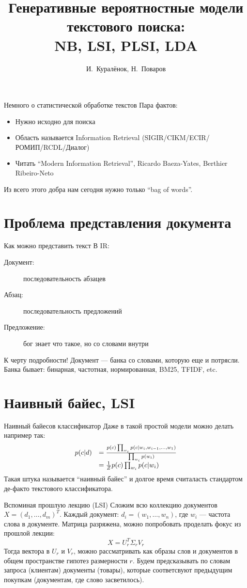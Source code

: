 \documentclass[14pt, fleqn, xcolor={dvipsnames, table}]{beamer}
\title{Генеративные вероятностные модели текстового поиска:\\\small{NB, LSI, PLSI, LDA}}
\author[]{\small{%
И.~Куралёнок,
Н.~Поваров}}
\date{}
\begin{document}
\begin{frame}{Немного о статистической обработке текстов}
Пара фактов:
\begin{itemize}
  \item Нужно исходно для поиска
  \item Область называется Information Retrieval (SIGIR/CIKM/ECIR/РОМИП/RCDL/Диалог)
  \item Читать ``Modern Information Retrieval'', Ricardo Baeza-Yates, Berthier Ribeiro-Neto
\end{itemize}
Из всего этого добра нам сегодня нужно только ``bag of words''.
\end{frame}

\section{Проблема представления документа}
\begin{frame}{Как можно представить текст}
В IR:
\begin{description}
  \item[Документ:] последовательность абзацев
  \item[Абзац:] последовательность предложений
  \item[Предложение:] бог знает что такое, но со словами внутри
\end{description}
К черту подробности! Документ --- банка со словами, которую еще и потрясли.\\ Банка бывает: бинарная, частотная, нормированная, BM25, TFIDF, etc.
\end{frame}

\section{Наивный байес, LSI}

\begin{frame}{Наивный байесов классификатор}
Даже в такой простой модели можно делать например так:
$$\begin{array}{ll}
p(c|d) &= {p(c)\prod_{w_i} p(c|w_i, w_{i-1}, \ldots, w_1) \over \prod_{w_i} p(w_i)} \\
& = \frac{1}{Z} p(c) \prod_{w_i} p(c|w_i)
\end{array}$$
Такая штука называется ``наивный байес'' и долгое время считаласть стандартом де-факто текстового классификатора.
\end{frame}

\begin{frame}{Вспоминая прошлую лекцию (LSI)}
\small
Сложим всю коллекцию документов $X = (d_1,\ldots,d_m)^T$. Каждый документ: $d_i = (w_1, \dots, w_n)$, где $w_i$ --- частота слова в документе. Матрица разряжена, можно попробовать проделать фокус из прошлой лекции:
$$
X = U^T_r \Sigma_r V_r
$$
Тогда вектора в $U_r$ и $V_r$, можно рассматривать как образы слов и документов в общем пространстве гипотез размерности $r$. Будем предсказывать по словам запроса (клиентам) документы (товары), которые соответсвуют предыдущим покупкам (документам, где слово засветилось).
\end{frame}
\end{document}
